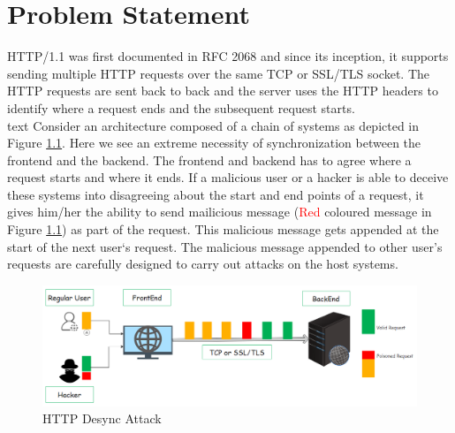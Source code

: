 \chapter{Problem Statement}
HTTP/1.1 was first documented in RFC 2068 \cite{b9} and since its inception, it supports sending multiple HTTP requests over the same TCP or SSL/TLS socket. The HTTP requests are sent back to back and the server uses the HTTP headers to identify where a request ends and the subsequent request starts. \\
\mbox{text}
Consider an architecture composed of a chain of systems as depicted in Figure \ref{fig:HTTP Desync Attack}. Here we see an extreme necessity of synchronization between the frontend and the backend. The frontend and backend has to agree where a request starts and where it ends. If a malicious user or a hacker is able to deceive these systems into disagreeing about the start and end points of a request, it gives him/her the ability to send mailicious message (\textcolor{red}{Red} coloured message in Figure \ref{fig:HTTP Desync Attack}) as part of the request. This malicious message gets appended at the start of the next user`s request. The malicious message appended to other user's requests are carefully designed to carry out attacks on the host systems. 

\begin{figure}
	\includegraphics[width=14cm]{images/HTTP_Desync}
	\caption{HTTP Desync Attack}
	\label{fig:HTTP Desync Attack}
\end{figure}
